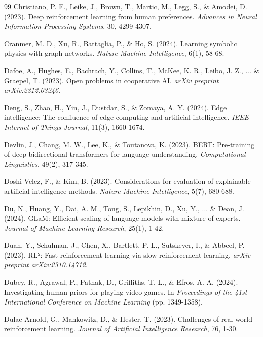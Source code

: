 \begin{thebibliography}{99}
Christiano, P. F., Leike, J., Brown, T., Martic, M., Legg, S., \& Amodei, D. (2023). Deep reinforcement learning from human preferences. \textit{Advances in Neural Information Processing Systems}, 30, 4299-4307.

Cranmer, M. D., Xu, R., Battaglia, P., \& Ho, S. (2024). Learning symbolic physics with graph networks. \textit{Nature Machine Intelligence}, 6(1), 58-68.

Dafoe, A., Hughes, E., Bachrach, Y., Collins, T., McKee, K. R., Leibo, J. Z., ... \& Graepel, T. (2023). Open problems in cooperative AI. \textit{arXiv preprint arXiv:2312.03246}.

Deng, S., Zhao, H., Yin, J., Dustdar, S., \& Zomaya, A. Y. (2024). Edge intelligence: The confluence of edge computing and artificial intelligence. \textit{IEEE Internet of Things Journal}, 11(3), 1660-1674.

Devlin, J., Chang, M. W., Lee, K., \& Toutanova, K. (2023). BERT: Pre-training of deep bidirectional transformers for language understanding. \textit{Computational Linguistics}, 49(2), 317-345.

Doshi-Velez, F., \& Kim, B. (2023). Considerations for evaluation of explainable artificial intelligence methods. \textit{Nature Machine Intelligence}, 5(7), 680-688.

Du, N., Huang, Y., Dai, A. M., Tong, S., Lepikhin, D., Xu, Y., ... \& Dean, J. (2024). GLaM: Efficient scaling of language models with mixture-of-experts. \textit{Journal of Machine Learning Research}, 25(1), 1-42.

Duan, Y., Schulman, J., Chen, X., Bartlett, P. L., Sutskever, I., \& Abbeel, P. (2023). RL²: Fast reinforcement learning via slow reinforcement learning. \textit{arXiv preprint arXiv:2310.14712}.

Dubey, R., Agrawal, P., Pathak, D., Griffiths, T. L., \& Efros, A. A. (2024). Investigating human priors for playing video games. In \textit{Proceedings of the 41st International Conference on Machine Learning} (pp. 1349-1358).

Dulac-Arnold, G., Mankowitz, D., \& Hester, T. (2023). Challenges of real-world reinforcement learning. \textit{Journal of Artificial Intelligence Research}, 76, 1-30.


\end{thebibliography}
